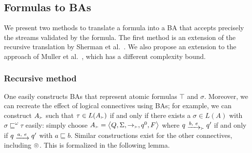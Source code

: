 \documentclass[a4paper]{article}
\newcommand{\angl}[1]{\left\langle#1\right\rangle}
\newcommand{\myrightarrow}[1]{\mathrel{\raisebox{-3pt}{$\xrightarrow{#1}$}}}
\newcommand{\composable}{\mathop{\ocircle}\nolimits}
\theoremstyle{definition}
\newcommand{\captures}{\mathop{\Yright}}
\begin{document}
\begin{appendix}
\subsection{Formulas to BAs}

We present two methods to translate a formula into a BA that accepts precisely the streams validated by the formula. The first method is an extension of the recursive translation by Sherman et al.~\cite{sherman-pnueli-harel-1984}. We also propose an extension to the approach of Muller et al.~\cite{muller-saoudi-schupp-1988}, which has a different complexity bound.

\subsubsection{Recursive method}
One easily constructs BAs that represent atomic formulas $\top$ and $\sigma$. Moreover, we can recreate the effect of logical connectives using BAs; for example, we can construct $A_{\captures}$ such that $\tau \in L(A_{\captures})$ if and only if there exists a $\sigma \in L(A)$ with $\sigma \sqsubseteq^\omega \tau$ easily: simply choose $A_{\captures} = \angl{Q, \Sigma, \rightarrow_{\captures}, q^0, F}$ where $q \myrightarrow{b,\ e}_{\captures} q'$ if and only if $q \myrightarrow{a,\ e} q'$ with $a \sqsubseteq b$. Similar constructions exist for the other connectives, including $\composable$. This is formalized in the following lemma.


\end{appendix}
\end{document}

